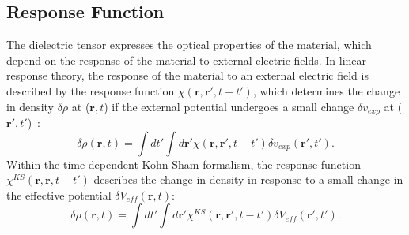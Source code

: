 \begin{refsection}
\subsection{Response Function} 

The dielectric tensor expresses the optical properties of the material, which 
depend on the response of the material to external electric fields. In linear 
response theory, the response of the material to an external electric field is 
described by the response function $\chi(\mathbf{r},\mathbf{r}', t - t')$, 
which determines the change in density $\delta \rho$ at ($\mathbf{r},t$) if the 
external potential undergoes a small change $\delta v_{exp}$ at 
($\mathbf{r}',t'$)~\cite{Harl2008}: 
\begin{equation}\label{dft:eq-response} 
\delta \rho (\mathbf{r},t) = \int dt' \int d\mathbf{r}' 
\chi(\mathbf{r},\mathbf{r}', t - t') \delta v_{exp} (\mathbf{r}',t'). 
\end{equation} 
Within the time-dependent Kohn-Sham formalism, the response function 
$\chi^{KS}(\mathbf{r},\mathbf{r}, t - t')$ describes the change in density in 
response to a small change in the effective potential $\delta 
V_{eff}(\mathbf{r},t)$: 
\begin{equation}\label{dft:eq-KSresponse} 
\delta \rho (\mathbf{r},t) = \int dt' \int d\mathbf{r}' 
\chi^{KS}(\mathbf{r},\mathbf{r}', t - t') \delta V_{eff} (\mathbf{r}',t'). 
\end{equation} 
 

\end{refsection}

